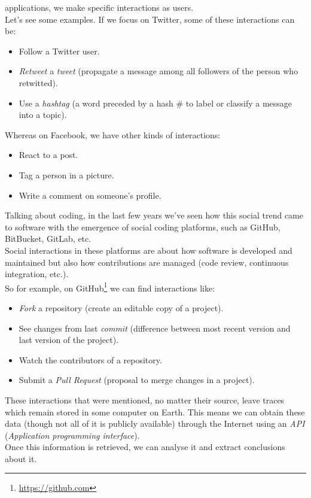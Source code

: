 \documentclass[a4paper, 12pt]{book}
\begin{document}
applications, we make specific interactions as users. \\
Let's see some examples. If we focus on Twitter, some of these interactions can be:
\begin{itemize}
    \item Follow a Twitter user.
    \item \textit{Retweet} a \textit{tweet} (propagate a message among all followers of the person who retwitted).
    \item Use a \textit{hashtag} (a word preceded by a hash \# to label or classify a message into a topic).
\end{itemize}
Whereas on Facebook, we have other kinds of interactions:
\begin{itemize}
    \item React to a post.
    \item Tag a person in a picture.
    \item Write a comment on someone's profile.
\end{itemize}
Talking about coding, in the last few years we've seen how this social trend came to software with the
emergence of social coding platforms, such as GitHub, BitBucket, GitLab, etc.\\
Social interactions in these platforms are about how software is developed and maintained but also how
contributions are managed (code review, continuous integration, etc.).\\
So for example, on GitHub\footnote{\url{https://github.com}} we can find interactions like:
\begin{itemize}
    \item \textit{Fork} a repository (create an editable copy of a project).
    \item See changes from last \textit{commit} (difference between most recent version and last version of the project).
    \item Watch the contributors of a repository.
    \item Submit a \textit{Pull Request} (proposal to merge changes in a project).
\end{itemize}
These interactions that were mentioned, no matter their source, leave traces which remain stored in some computer on Earth.
This means we can obtain these data (though not all of it is publicly available) through the Internet using an \emph{API}
(\textit{Application programming interface}).\\
Once this information is retrieved, we can analyse it and extract conclusions about it.
\end{document}
